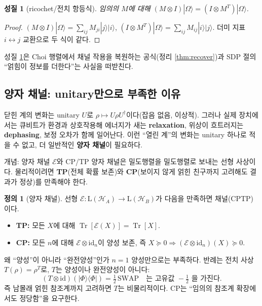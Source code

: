 \documentclass[11pt,a4paper]{article}
\newcommand{\E}{\mathcal{E}}
\newcommand{\Hcal}{\mathcal{H}}
\newcommand{\Tr}{\operatorname{Tr}}
\newcommand{\id}{\mathrm{id}}
\newcommand{\Lin}{\mathrm{L}}
\theoremstyle{definition}
\newtheorem{definition}{정의}[section]
\theoremstyle{plain}
\newtheorem{property}{성질}[section]
\theoremstyle{remark}
\begin{document}
\begin{property}[ricochet/전치 항등식]\label{prop:ricochet}
임의의 $M$에 대해 $(M\otimes I)|\Omega\rangle=(I\otimes M^T)|\Omega\rangle$.
\end{property}
\begin{proof}
$(M\otimes I)|\Omega\rangle=\sum_{ij}M_{ji}|j\rangle|i\rangle$, $(I\otimes M^T)|\Omega\rangle=\sum_{ij}M_{ij}|i\rangle|j\rangle$. 더미 지표 $i\leftrightarrow j$ 교환으로 두 식이 같다.
\end{proof}

성질 \ref{prop:ricochet}은 Choi 행렬에서 채널 작용을 복원하는 공식(정리 \ref{thm:recover})과 SDP 절의 ``얽힘이 정보를 더한다''는 사실을 떠받친다.

\subsection{양자 채널: unitary만으로 부족한 이유}

닫힌 계의 변화는 unitary $U$로 $\rho\mapsto U\rho U^\dagger$이다(잡음 없음, 이상적). 그러나 실제 장치에서는 큐비트가 환경과 상호작용해 에너지가 새는 \textbf{relaxation}, 위상이 흐트러지는 \textbf{dephasing}, 보정 오차가 함께 일어난다. 이런 ``열린 계''의 변화는 unitary 하나로 적을 수 없고, 더 일반적인 \textbf{양자 채널}이 필요하다.

\begin{conceptbox}{개념: 양자 채널 $\E$와 CP/TP}
양자 채널은 밀도행렬을 밀도행렬로 보내는 선형 사상이다. 물리적이려면 \textbf{TP}(전체 확률 보존)와 \textbf{CP}(보이지 않게 얽힌 친구까지 고려해도 결과가 정상)를 만족해야 한다.
\end{conceptbox}

\begin{definition}[양자 채널]
선형 $\E:\Lin(\Hcal_A)\to\Lin(\Hcal_B)$가 다음을 만족하면 채널(CPTP)이다.
\begin{itemize}[leftmargin=1.6em]
  \item \textbf{TP:} 모든 $X$에 대해 $\Tr[\E(X)]=\Tr[X]$.
  \item \textbf{CP:} 모든 $n$에 대해 $\E\otimes\id_n$이 양성 보존, 즉 $X\succeq0\Rightarrow(\E\otimes\id_n)(X)\succeq0$.
\end{itemize}
\end{definition}

\begin{mathbox}{왜 ``양성''이 아니라 ``완전양성''인가}
$n=1$ 양성만으로는 부족하다. 반례는 전치 사상 $T(\rho)=\rho^T$로, $T$는 양성이나 완전양성이 아니다:
\[
(T\otimes\id)(|\Phi\rangle\langle\Phi|)=\tfrac12\,\mathrm{SWAP}\quad\text{는 고유값 }-\tfrac12\text{ 을 가진다.}
\]
즉 남몰래 얽힌 참조계까지 고려하면 $T$는 비물리적이다. CP는 ``임의의 참조계 확장에서도 정당함''을 요구한다.
\end{mathbox}
\end{document}
